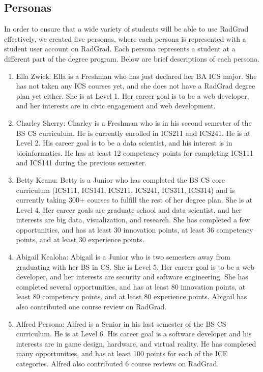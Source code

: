 \subsection{Personas}
In order to ensure that a wide variety of students will be able to use RadGrad effectively, we created five personas, where each persona is represented with a student user account on RadGrad. Each persona represents a student at a different part of the degree program. Below are brief descriptions of each persona. 

\begin{enumerate}
  \item Ella Zwick: Ella is a Freshman who has just declared her BA ICS major. She has not taken any ICS courses yet, and she does not have a RadGrad degree plan yet either. She is at Level 1. Her career goal is to be a web developer, and her interests are in civic engagement and web development. 
  \item Charley Sherry: Charley is a Freshman who is in his second semester of the BS CS curriculum. He is currently enrolled in ICS211 and ICS241. He is at Level 2. His career goal is to be a data scientist, and his interest is in bioinformatics.  He has at least 12 competency points for completing ICS111 and ICS141 during the previous semester. 
  \item Betty Keanu: Betty is a Junior who has completed the BS CS core curriculum (ICS111, ICS141, ICS211, ICS241, ICS311, ICS314) and is currently taking 300+ courses to fulfill the rest of her degree plan. She is at Level 4. Her career goals are graduate school and data scientist, and her interests are big data, visualization, and research. She has completed a few opportunities, and has at least 30 innovation points, at least 36 competency points, and at least 30 experience points. 
  \item Abigail Kealoha: Abigail is a Junior who is two semesters away from graduating with her BS in CS. She is Level 5. Her career goal is to be a web developer, and her interests are security and software engineering. She has completed several opportunities, and has at least 80 innovation points, at least 80 competency points, and at least 80 experience points. Abigail has also contributed one course review on RadGrad. 
  \item Alfred Persona: Alfred is a Senior in his last semester of the BS CS curriculum. He is at Level 6. His career goal is a software developer and his interests are in game design, hardware, and virtual reality. He has completed many opportunities, and has at least 100 points for each of the ICE categories. Alfred also contributed 6 course reviews on RadGrad.
\end{enumerate} 


